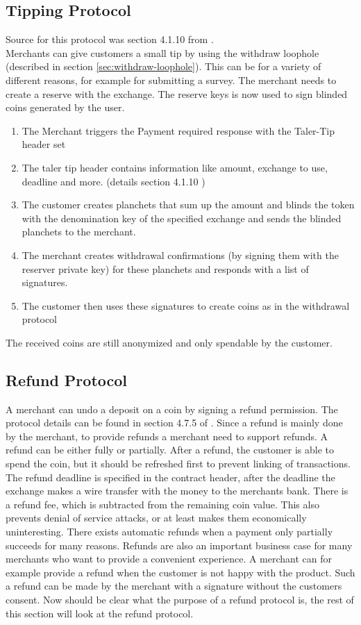 \subsection{Tipping Protocol}
\label{sec:tipping}
Source for this protocol was section 4.1.10 from \cite{dold:the-gnu-taler-system}.\\
Merchants can give customers a small tip by using the withdraw loophole (described in section \ref{sec:withdraw-loophole}).
This can be for a variety of different reasons, for example for submitting a survey.
The merchant needs to create a reserve with the exchange.
The reserve keys is now used to sign blinded coins generated by the user.
\begin{enumerate}
    \item The Merchant triggers the Payment required response with the Taler-Tip header set
    \item The taler tip header contains information like amount, exchange to use, deadline and more. (details section 4.1.10 \cite{dold:the-gnu-taler-system})
    \item The customer creates planchets that sum up the amount and blinds the token with the denomination key of the specified exchange and sends the blinded planchets to the merchant.
    \item The merchant creates withdrawal confirmations (by signing them with the reserver private key) for these planchets and responds with a list of signatures.
    \item The customer then uses these signatures to create coins as in the withdrawal protocol
\end{enumerate}
The received coins are still anonymized and only spendable by the customer.


\subsection{Refund Protocol}
A merchant can undo a deposit on a coin by signing a refund permission.
The protocol details can be found in section 4.7.5 of \cite{dold:the-gnu-taler-system}.
Since a refund is mainly done by the merchant, to provide refunds a merchant need to support refunds.
A refund can be either fully or partially.
After a refund, the customer is able to spend the coin, but it should be refreshed first to prevent linking of transactions.
The refund deadline is specified in the contract header, after the deadline the exchange makes a wire transfer with the money to the merchants bank.
There is a refund fee, which is subtracted from the remaining coin value.
This also prevents denial of service attacks, or at least makes them economically uninteresting.
There exists automatic refunds when a payment only partially succeeds for many reasons.
Refunds are also an important business case for many merchants who want to provide a convenient experience.
A merchant can for example provide a refund when the customer is not happy with the product.
Such a refund can be made by the merchant with a signature without the customers consent.
Now should be clear what the purpose of a refund protocol is, the rest of this section will look at the refund protocol.


